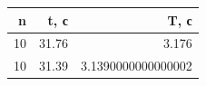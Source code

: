 \begin{tabular}{rrr}
\toprule
n & t, с & T, с \\
\midrule
10 & 31.76 & 3.176 \\
10 & 31.39 & 3.1390000000000002 \\
\bottomrule
\end{tabular}
